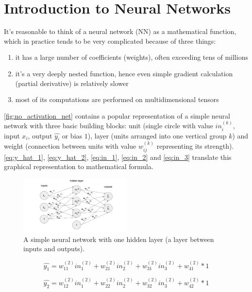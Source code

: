 \documentclass[11pt]{article}
\begin{document}
\section{Introduction to Neural Networks} \label{introduction_to_nn}
It's reasonable to think of a neural network (NN) as a mathematical function, which in practice tends to be very complicated because of three things:
\begin{enumerate}[1)]
\item it has a large number of coefficients (weights), often exceeding tens of millions
\item it's a very deeply nested function, hence even simple gradient calculation (partial derivative) is relatively slower
\item most of its computations are performed on multidimensional tensors
\end{enumerate}
\autoref{fig:no_activation_net} contains a popular representation of a simple neural network with three basic building blocks: unit (single circle with value $in_i^{(k)}$, input $x_i$, output $\hat{y_i}$ or bias $1$), layer (units arranged into one vertical group $k$) and weight (connection between units with value $w_{ij}^{(k)}$ representing its strength). \autoref{eq:y_hat_1}, \ref{eq:y_hat_2}, \ref{eq:in_1}, \ref{eq:in_2} and \ref{eq:in_3} translate this graphical representation to mathematical formula.\\

\begin{figure}[h]
\includegraphics[width=0.5\textwidth]{no_activation_net}
\centering
\caption{A simple neural network with one hidden layer (a layer between inputs and outputs).}
\label{fig:no_activation_net}
\end{figure}

\begin{equation} \label{eq:y_hat_1}
\hat{y_1} = w_{11}^{(2)}in_1^{(2)} + w_{21}^{(2)}in_2^{(2)} + w_{31}^{(2)}in_3^{(2)} + w_{41}^{(2)} * 1 
\end{equation}

\begin{equation} \label{eq:y_hat_2}
\hat{y_2} = w_{12}^{(2)}in_1^{(2)} + w_{22}^{(2)}in_2^{(2)} + w_{32}^{(2)}in_3^{(2)} + w_{42}^{(2)} * 1 
\end{equation}
\end{document}

